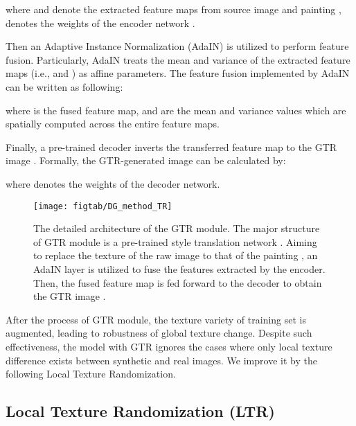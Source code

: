 \documentclass[twocolumn,journal,vlined,ruled,linesnumbered]{IEEEtran}
\begin{document}
\vspace{-2mm}


where  and  denote the extracted feature maps from source image  and painting ,  denotes the weights of the encoder network  .

Then an Adaptive Instance Normalization (AdaIN) \cite{huang2017arbitrary} is utilized to perform feature fusion. Particularly, AdaIN treats the mean and variance of the extracted feature maps (i.e.,  and ) as affine parameters. The feature fusion implemented by AdaIN can be written as following:


where  is the fused feature map,  and  are the mean and variance values which are spatially computed across the entire feature maps.

Finally, a pre-trained decoder inverts the transferred feature map  to the GTR image . Formally, the GTR-generated image  can be calculated by:

\vspace{-2mm}


where  denotes the weights of the decoder network.

\begin{figure}[t]
\begin{centering}
\texttt{[image: figtab/DG\_method\_TR]}
\par\end{centering}
\vspace{-2mm}
\caption{The detailed architecture of the GTR module. The major structure of GTR module is a pre-trained style translation network \cite{huang2017arbitrary}. Aiming to replace the texture of the raw image  to that of the painting , an AdaIN layer \cite{huang2017arbitrary} is utilized to fuse the features extracted by the encoder. Then, the fused feature map  is fed forward to the decoder to obtain the GTR image .\label{fig:The-detailed-architecture}}
\vspace{-4mm}
\end{figure}

After the process of GTR module, the texture variety of training set is augmented, leading to robustness of global texture change. Despite such effectiveness, the model with GTR ignores the cases where only local texture difference exists between synthetic and real images. We improve it by the following Local Texture Randomization.

\subsection{Local Texture Randomization (LTR)}
\end{document}

